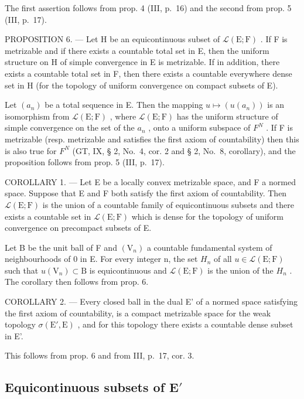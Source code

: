 The first assertion follows from prop. 4 (III, p.~16) and the second from prop. 5 (III, p.~17).

PROPOSITION 6. --- Let H be an equicontinuous subset of \(\mathcal{L}(\mathrm{E};\mathrm{F})\) . If F is metrizable and if there exists a countable total set in E, then the uniform structure on H of simple convergence in E is metrizable. If in addition, there exists a countable total set in F, then there exists a countable everywhere dense set in H (for the topology of uniform convergence on compact subsets of E).

Let \((a_{n})\) be a total sequence in E. Then the mapping \(u \mapsto (u(a_{n}))\) is an isomorphism from \(\mathcal{L}(\mathrm{E};\mathrm{F})\) , where \(\mathcal{L}(\mathrm{E};\mathrm{F})\) has the uniform structure of simple convergence on the set of the \(a_{n}\) , onto a uniform subspace of \(F^{N}\) . If F is metrizable (resp. metrizable and satisfies the first axiom of countability) then this is also true for \(F^{N}\) (GT, IX, § 2, No.~4, cor. 2 and § 2, No.~8, corollary), and the proposition follows from prop. 5 (III, p.~17).

COROLLARY 1. --- Let E be a locally convex metrizable space, and F a normed space. Suppose that E and F both satisfy the first axiom of countability. Then \(\mathcal{L}(\mathrm{E};\mathrm{F})\) is the union of a countable family of equicontinuous subsets and there exists a countable set in \(\mathcal{L}(\mathrm{E};\mathrm{F})\) which is dense for the topology of uniform convergence on precompact subsets of E.

Let B be the unit ball of F and \((\mathrm{V}_{n})\) a countable fundamental system of neighbourhoods of 0 in E. For every integer n, the set \(H_{n}\) of all \(u \in \mathcal{L}(\mathrm{E}; \mathrm{F})\) such that \(u(\mathrm{V}_{n}) \subset \mathrm{B}\) is equicontinuous and \(\mathcal{L}(\mathrm{E}; \mathrm{F})\) is the union of the \(H_{n}\) . The corollary then follows from prop. 6.

COROLLARY 2. --- Every closed ball in the dual E' of a normed space satisfying the first axiom of countability, is a compact metrizable space for the weak topology \(\sigma(\mathrm{E}',\mathrm{E})\) , and for this topology there exists a countable dense subset in E'.

This follows from prop. 6 and from III, p.~17, cor. 3.

\subsection{\texorpdfstring{Equicontinuous subsets of \(\mathbf{E}'\)}{Equicontinuous subsets of \textbackslash mathbf\{E\}\textquotesingle{}}}

